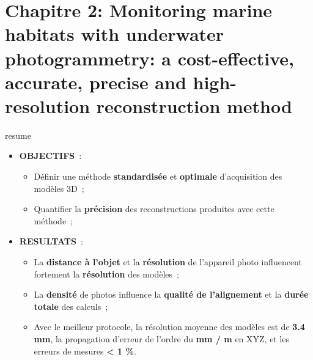 \chapter[Monitoring marine habitats with underwater photogrammetry: a cost-effective, accurate, precise and high-resolution reconstruction method]{Chapitre 2: Monitoring marine habitats with underwater photogrammetry: a cost-effective, accurate, precise and high-resolution reconstruction method} \label{chapitre2-methode}

\pagestyle{main}

\begin{center}
\end{center}


\setlength{\fboxsep}{8pt}
\setlength{\fboxrule}{0pt}
\begin{center}
\begin{colbox}{resume}
  \vspace{-2pt}
{\color{textresume}\small
\begin{itemize}[leftmargin=0in]\itemsep3pt
\item \textbf{OBJECTIFS}~:
    \begin{itemize}
      \item Définir une méthode \textbf{standardisée} et \textbf{optimale} d'acquisition des modèles 3D~;
      \item Quantifier la \textbf{précision} des reconstructions produites avec cette méthode~;
    \end{itemize}
\item \textbf{RESULTATS}~:
    \begin{itemize}
      \item La \textbf{distance à l'objet} et la \textbf{résolution} de l'appareil photo influencent fortement la \textbf{résolution} des modèles~;
      \item La \textbf{densité} de photos influence la \textbf{qualité de l'alignement} et la \textbf{durée totale} des calculs~;
      \item Avec le meilleur protocole, la résolution moyenne des modèles est de \textbf{3.4 mm}, la propagation d'erreur de l'ordre du \textbf{mm / m} en XYZ, et les erreurs de mesures \textbf{< 1 \%}.
    \end{itemize}
\end{itemize}
}
\vspace{-2pt}
\end{colbox}
\end{center}

